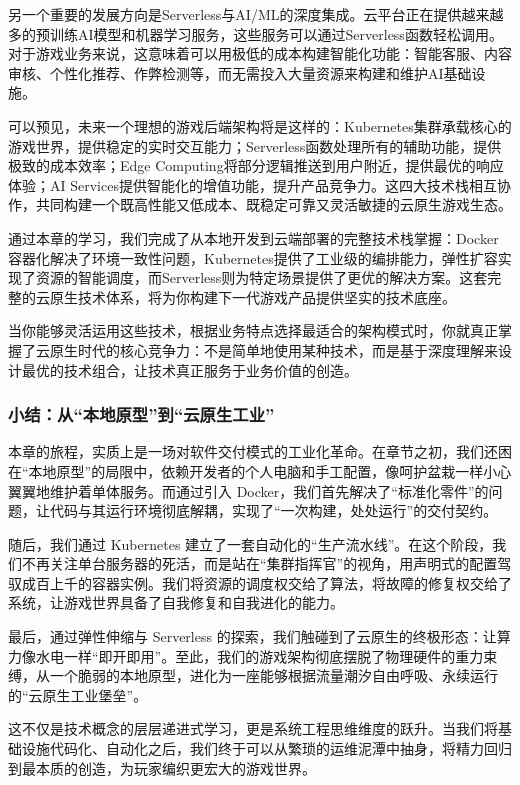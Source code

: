 另一个重要的发展方向是Serverless与AI/ML的深度集成。云平台正在提供越来越多的预训练AI模型和机器学习服务，这些服务可以通过Serverless函数轻松调用。对于游戏业务来说，这意味着可以用极低的成本构建智能化功能：智能客服、内容审核、个性化推荐、作弊检测等，而无需投入大量资源来构建和维护AI基础设施。

可以预见，未来一个理想的游戏后端架构将是这样的：Kubernetes集群承载核心的游戏世界，提供稳定的实时交互能力；Serverless函数处理所有的辅助功能，提供极致的成本效率；Edge Computing将部分逻辑推送到用户附近，提供最优的响应体验；AI Services提供智能化的增值功能，提升产品竞争力。这四大技术栈相互协作，共同构建一个既高性能又低成本、既稳定可靠又灵活敏捷的云原生游戏生态。

通过本章的学习，我们完成了从本地开发到云端部署的完整技术栈掌握：Docker容器化解决了环境一致性问题，Kubernetes提供了工业级的编排能力，弹性扩容实现了资源的智能调度，而Serverless则为特定场景提供了更优的解决方案。这套完整的云原生技术体系，将为你构建下一代游戏产品提供坚实的技术底座。

当你能够灵活运用这些技术，根据业务特点选择最适合的架构模式时，你就真正掌握了云原生时代的核心竞争力：不是简单地使用某种技术，而是基于深度理解来设计最优的技术组合，让技术真正服务于业务价值的创造。


\subsubsection{小结：从“本地原型”到“云原生工业”}

本章的旅程，实质上是一场对软件交付模式的工业化革命。在章节之初，我们还困在“本地原型”的局限中，依赖开发者的个人电脑和手工配置，像呵护盆栽一样小心翼翼地维护着单体服务。而通过引入 Docker，我们首先解决了“标准化零件”的问题，让代码与其运行环境彻底解耦，实现了“一次构建，处处运行”的交付契约。

随后，我们通过 Kubernetes 建立了一套自动化的“生产流水线”。在这个阶段，我们不再关注单台服务器的死活，而是站在“集群指挥官”的视角，用声明式的配置驾驭成百上千的容器实例。我们将资源的调度权交给了算法，将故障的修复权交给了系统，让游戏世界具备了自我修复和自我进化的能力。

最后，通过弹性伸缩与 Serverless 的探索，我们触碰到了云原生的终极形态：让算力像水电一样“即开即用”。至此，我们的游戏架构彻底摆脱了物理硬件的重力束缚，从一个脆弱的本地原型，进化为一座能够根据流量潮汐自由呼吸、永续运行的“云原生工业堡垒”。

这不仅是技术概念的层层递进式学习，更是系统工程思维维度的跃升。当我们将基础设施代码化、自动化之后，我们终于可以从繁琐的运维泥潭中抽身，将精力回归到最本质的创造，为玩家编织更宏大的游戏世界。

\newpage